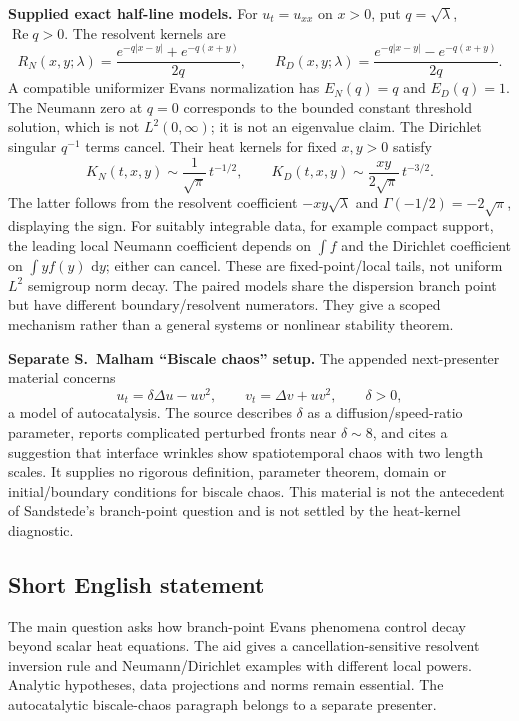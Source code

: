 \documentclass[11pt]{article}
\newcommand{\dd}{\,\mathrm{d}}
\begin{document}
\textbf{Supplied exact half-line models.} For $u_t=u_{xx}$ on $x>0$, put $q=\sqrt\lambda$, $\operatorname{Re}q>0$. The resolvent kernels are
\[
 R_N(x,y;\lambda)=\frac{e^{-q|x-y|}+e^{-q(x+y)}}{2q},\qquad
 R_D(x,y;\lambda)=\frac{e^{-q|x-y|}-e^{-q(x+y)}}{2q}.
\]
A compatible uniformizer Evans normalization has $E_N(q)=q$ and $E_D(q)=1$. The Neumann zero at $q=0$ corresponds to the bounded constant threshold solution, which is not $L^2(0,\infty)$; it is not an eigenvalue claim. The Dirichlet singular $q^{-1}$ terms cancel. Their heat kernels for fixed $x,y>0$ satisfy
\[
 K_N(t,x,y)\sim\frac1{\sqrt\pi}\,t^{-1/2},\qquad
 K_D(t,x,y)\sim\frac{xy}{2\sqrt\pi}\,t^{-3/2}.
\]
The latter follows from the resolvent coefficient $-xy\sqrt\lambda$ and $\Gamma(-1/2)=-2\sqrt\pi$, displaying the sign. For suitably integrable data, for example compact support, the leading local Neumann coefficient depends on $\int f$ and the Dirichlet coefficient on $\int yf(y)\,\dd y$; either can cancel. These are fixed-point/local tails, not uniform $L^2$ semigroup norm decay. The paired models share the dispersion branch point but have different boundary/resolvent numerators. They give a scoped mechanism rather than a general systems or nonlinear stability theorem.

\textbf{Separate S.~Malham ``Biscale chaos'' setup.} The appended next-presenter material concerns
\[
 u_t=\delta\Delta u-uv^2,\qquad v_t=\Delta v+uv^2,
 \qquad\delta>0,
\]
a model of autocatalysis. The source describes $\delta$ as a diffusion/speed-ratio parameter, reports complicated perturbed fronts near $\delta\sim8$, and cites a suggestion that interface wrinkles show spatiotemporal chaos with two length scales. It supplies no rigorous definition, parameter theorem, domain or initial/boundary conditions for biscale chaos. This material is not the antecedent of Sandstede's branch-point question and is not settled by the heat-kernel diagnostic.
\subsection{Short English statement}
The main question asks how branch-point Evans phenomena control decay beyond scalar heat equations. The aid gives a cancellation-sensitive resolvent inversion rule and Neumann/Dirichlet examples with different local powers. Analytic hypotheses, data projections and norms remain essential. The autocatalytic biscale-chaos paragraph belongs to a separate presenter.
\end{document}
